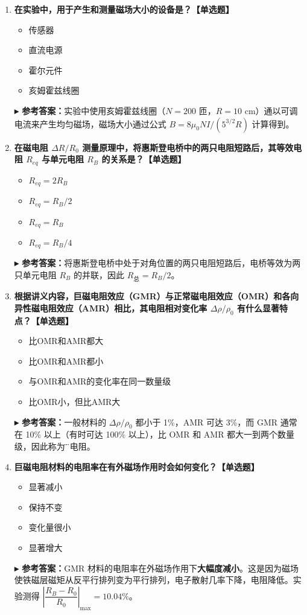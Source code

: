 \documentclass[12pt,a4paper]{article}
\newcommand{\answer}[1]{\vspace{2pt}\noindent\textbf{\color{teal!80!black}▸ 参考答案：}#1\vspace{4pt}}
\begin{document}
\begin{enumerate}[label=\arabic*.]
    \item \textbf{在实验中，用于产生和测量磁场大小的设备是？【单选题】}
    \begin{itemize}
        \item 传感器
        \item 直流电源
        \item 霍尔元件
        \item[\checkmark] 亥姆霍兹线圈
    \end{itemize}
    \answer{实验中使用亥姆霍兹线圈（$N=200$ 匝，$R=10$ cm）通以可调电流来产生均匀磁场，磁场大小通过公式 $B = 8\mu_0 NI / (5^{3/2}R)$ 计算得到。}

    \item \textbf{在磁电阻 \(\Delta R / R_0\) 测量原理中，将惠斯登电桥中的两只电阻短路后，其等效电阻 \(R_{eq}\) 与单元电阻 \(R_B\) 的关系是？【单选题】}
    \begin{itemize}
        \item \(R_{eq} = 2R_B\)
        \item[\checkmark] \(R_{eq} = R_B / 2\)
        \item \(R_{eq} = R_B\)
        \item \(R_{eq} = R_B / 4\)
    \end{itemize}
    \answer{将惠斯登电桥中处于对角位置的两只电阻短路后，电桥等效为两只单元电阻 $R_B$ 的并联，因此 $R_{\text{总}} = R_B/2$。}

    \item \textbf{根据讲义内容，巨磁电阻效应（GMR）与正常磁电阻效应（OMR）和各向异性磁电阻效应（AMR）相比，其电阻相对变化率 \(\Delta \rho / \rho_0\) 有什么显著特点？【单选题】}
    \begin{itemize}
        \item[\checkmark] 比OMR和AMR都大
        \item 比OMR和AMR都小
        \item 与OMR和AMR的变化率在同一数量级
        \item 比OMR小，但比AMR大
    \end{itemize}
    \answer{一般材料的 $\Delta\rho/\rho_0$ 都小于 1\%，AMR 可达 3\%，而 GMR 通常在 10\% 以上（有时可达 100\% 以上），比 OMR 和 AMR 都大一到两个数量级，因此称为\"巨\"磁电阻。}

    \item \textbf{巨磁电阻材料的电阻率在有外磁场作用时会如何变化？【单选题】}
    \begin{itemize}
        \item[\checkmark] 显著减小
        \item 保持不变
        \item 变化量很小
        \item 显著增大
    \end{itemize}
    \answer{GMR 材料的电阻率在外磁场作用下\textbf{大幅度减小}。这是因为磁场使铁磁层磁矩从反平行排列变为平行排列，电子散射几率下降，电阻降低。实验测得 $\left|\dfrac{R_B-R_0}{R_0}\right|_{\max} = 10.04\%$。}


\end{enumerate}
\end{document}
